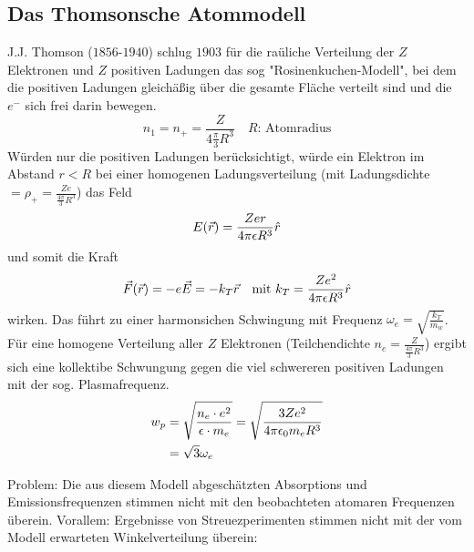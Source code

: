 \subsection{Das Thomsonsche Atommodell} %
\label{sub:Das_Thomsonsche_Atommodell}
J.J. Thomson ($1856$-$1940$) schlug $1903$ für die raüliche Verteilung der $Z$
Elektronen und $Z$ positiven Ladungen das sog "Rosinenkuchen-Modell", bei dem
die positiven Ladungen gleichäßig über die gesamte Fläche verteilt sind und die
$e^-$ sich frei darin bewegen.
\begin{equation*}
    n_1 = n_+ = \frac{Z}{4 \frac{\pi}{3} R^3} \quad \text{$R$: Atomradius}
\end{equation*}
Würden nur die positiven Ladungen berücksichtigt, würde ein Elektron im Abstand
$r<R$ bei einer homogenen Ladungsverteilung (mit Ladungsdichte $= \rho_+ =
\frac{Ze}{\frac{4 \pi}{3}R^3}$) das Feld
\begin{equation*}
    E(\vec{r}) = \frac{Zer}{4\pi\epsilon R^3} \hat{r}
\end{equation*}
und somit die Kraft
\begin{equation*}
    \vec{F}(\vec{r}) 
    =
    -e \vec{E}
    = - k_T \vec{r} \quad \text{mit $k_T = \frac{Ze^2}{4\pi\epsilon R^3} \hat{r}$}
\end{equation*}
wirken. Das führt zu einer harmonsichen Schwingung mit Frequenz $\omega_e =
\sqrt{\frac{k_T}{m_w}}$. Für eine homogene Verteilung aller $Z$ Elektronen
(Teilchendichte $n_e = \frac{Z}{\frac{4\pi}{3} R^3}$) ergibt sich eine
kollektibe Schwungung gegen die viel schwereren positiven Ladungen mit der
sog. Plasmafrequenz.
\begin{align*}
    w_p 
    &=
    \sqrt{ \frac{n_e \cdot e^2}{\epsilon \cdot m_e}}
    = 
    \sqrt{\frac{3 Z e^2}{4 \pi \epsilon_0 m_e R^3}} \\
    &=
    \sqrt{3} \omega_e
\end{align*}
\begin{erl}{Problem:}
    Die aus diesem Modell abgeschätzten Absorptions und Emissionsfrequenzen
    stimmen nicht mit den beobachteten atomaren Frequenzen überein. Vorallem:
    Ergebnisse von Streuezperimenten stimmen nicht mit der vom Modell
    erwarteten Winkelverteilung überein:
\end{erl}
